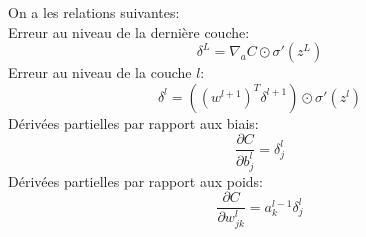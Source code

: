 \begin{proposition}
On a les relations suivantes: \\
Erreur au niveau de la dernière couche: 
\begin{equation}
\delta^{L} = \nabla_{a} C \odot \sigma'(z^{L})
\end{equation}
Erreur au niveau de la couche $l$:
\begin{equation}
\delta^{l} = ((w^{l+1})^T \delta^{l+1}) \odot \sigma'(z^{l})
\end{equation}
Dérivées partielles par rapport aux biais:
\begin{equation}
\frac{\partial C}{\partial b_{j}^{l}} = \delta_{j}^{l}
\end{equation}
Dérivées partielles par rapport aux poids:
\begin{equation}
\frac{\partial C}{\partial w_{jk}^{l}} = a_{k}^{l-1} \delta_{j}^{l}
\end{equation}
\end{proposition}
